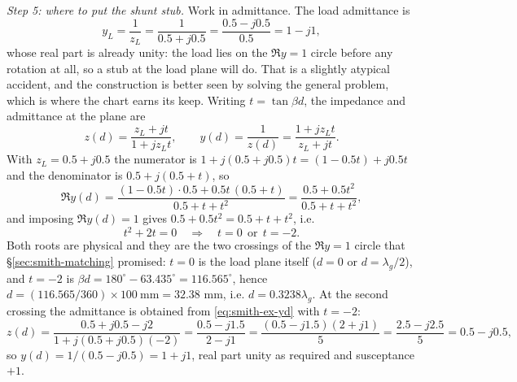 \emph{Step 5: where to put the shunt stub.} Work in admittance. The load admittance is
\begin{equation}
  y_L = \frac{1}{z_L} = \frac{1}{0.5+j0.5} = \frac{0.5-j0.5}{0.5} = 1-j1 ,
  \label{eq:smith-ex-yl}
\end{equation}
whose real part is already unity: the load lies on the $\Re y=1$ circle before any rotation at all, so a stub at
the load plane will do. That is a slightly atypical accident, and the construction is better seen by solving the
general problem, which is where the chart earns its keep. Writing $t=\tan\beta d$, the impedance and admittance
at the plane are
\begin{equation}
  z(d) = \frac{z_L+jt}{1+jz_Lt},
  \qquad
  y(d) = \frac{1}{z(d)} = \frac{1+jz_Lt}{z_L+jt} .
  \label{eq:smith-ex-yd}
\end{equation}
With $z_L=0.5+j0.5$ the numerator is $1+j(0.5+j0.5)t=(1-0.5t)+j0.5t$ and the denominator is $0.5+j(0.5+t)$, so
\begin{equation}
  \Re y(d) = \frac{(1-0.5t)\cdot 0.5 + 0.5t\,(0.5+t)}{0.5 + t + t^2}
           = \frac{0.5+0.5t^2}{0.5+t+t^2} ,
  \label{eq:smith-ex-reyd}
\end{equation}
and imposing $\Re y(d)=1$ gives $0.5+0.5t^2 = 0.5+t+t^2$, i.e.
\begin{equation}
  t^2 + 2t = 0 \quad\Longrightarrow\quad t=0 \ \ \text{or}\ \ t=-2 .
  \label{eq:smith-ex-t}
\end{equation}
Both roots are physical and they are the two crossings of the $\Re y=1$ circle that
\S\ref{sec:smith-matching} promised: $t=0$ is the load plane itself ($d=0$ or $d=\lambda_g/2$), and
$t=-2$ is $\beta d=180^\circ-63.435^\circ=116.565^\circ$, hence $d=(116.565/360)\times100\ \mathrm{mm}=32.38$ mm,
i.e. $d=0.3238\lambda_g$. At the second crossing the admittance is obtained from \eqref{eq:smith-ex-yd} with
$t=-2$:
\begin{equation}
  z(d) = \frac{0.5+j0.5-j2}{1+j(0.5+j0.5)(-2)} = \frac{0.5-j1.5}{2-j1}
       = \frac{(0.5-j1.5)(2+j1)}{5} = \frac{2.5-j2.5}{5} = 0.5-j0.5 ,
  \label{eq:smith-ex-yd-value}
\end{equation}
so $y(d)=1/(0.5-j0.5)=1+j1$, real part unity as required and susceptance $+1$.

